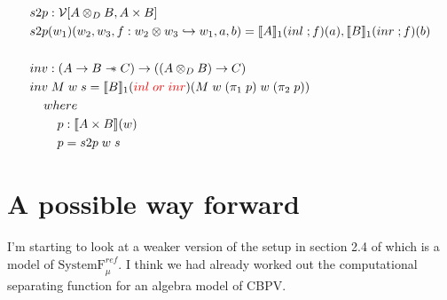 \documentclass{article}
\newcommand{\den}[1]{\llbracket #1 \rrbracket}
\newcommand{\sep}{\mathrel{-\mkern-6mu*}}
\newcommand{\red}[1]{\textcolor{red}{#1}}
\begin{document}
\begin{align*}
    &s2p : \mathcal{V}[ A \otimes_D B , A \times B]    \\
    &s2p (w_1)(w_2,w_3,f : w_2 \otimes w_3 \hookrightarrow w_1, a , b) = \den{A}_1(inl\; ; f )(a) , \den{B}_1(inr \; ; f)(b)\\
    \\
    &inv :(A \rightarrow B \sep C ) \rightarrow ((A \otimes_D B) \rightarrow C)\\
    &inv \; M \; w \; s = \den{B}_1(\red{inl \; or \; inr})(M \; w \; (\pi_1 \; p)\; w \; (\pi_2 \;p)) \\ 
    & \;\;\;\; where \\
    & \;\;\;\;\;\;\;\; p : \den{A \times B}(w)\\
    & \;\;\;\;\;\;\;\; p = s2p \; w \; s
\end{align*}

\section{A possible way forward}
I'm starting to look at a weaker version of the setup in section 2.4 of \cite{sterling_denotational_2023} 
which is a model of $\textrm{SystemF}_{\mu}^{ref}$. I think we had already worked out the 
computational separating function for an algebra model of CBPV. 



\end{document}
